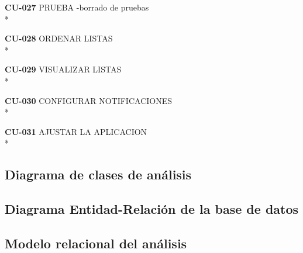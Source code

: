 \documentclass[../pfc.tex]{subfiles}
\begin{document}
	\textbf{CU-027}	 PRUEBA -borrado de pruebas\\*
	
	
	
	\textbf{CU-028}	ORDENAR LISTAS\\*
	
	
	
	\textbf{CU-029}	VISUALIZAR LISTAS\\*
	
	
	
	\textbf{CU-030}	CONFIGURAR NOTIFICACIONES\\*
	
	
	
	\textbf{CU-031}	AJUSTAR LA APLICACION\\*
	
	
		
	\subsection{Diagrama de clases de análisis}
		
	\subsection{Diagrama Entidad-Relación de la base de datos}
		
	\subsection{Modelo relacional del análisis}
	
\end{document}
